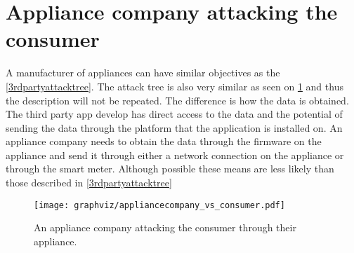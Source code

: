 
\section{Appliance company attacking the consumer}
A manufacturer of appliances can have similar objectives as the \cref{3rdpartyattacktree}.
The attack tree is also very similar as seen on \cref{applianceCompanyTree} and thus the description will not be repeated.
The difference is how the data is obtained.
The third party app develop has direct access to the data and the potential of sending the data through the platform that the application is installed on.
An appliance company needs to obtain the data through the firmware on the appliance and send it through either a network connection on the appliance or through the smart meter.
Although possible these means are less likely than those described in \cref{3rdpartyattacktree}

\begin{figure}[H]
  \begin{center}
    \texttt{[image: graphviz/appliancecompany\_vs\_consumer.pdf]}
  \end{center}
  \caption{An appliance company attacking the consumer through their appliance.}
  \label{applianceCompanyTree}
\end{figure}